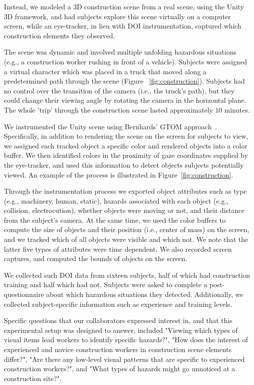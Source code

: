Instead, we modeled a 3D construction scene from a real scene, using the Unity 3D framework, and had subjects explore this scene virtually on a computer screen, while an eye-tracker, in lieu with DOI instrumentation, captured which construction elements they observed. 

The scene was dynamic and involved multiple unfolding hazardous situations (e.g., a construction worker rushing in front of a vehicle). Subjects were assigned a virtual character which was placed in a truck that moved along a predetermined path through the scene (Figure ~\ref{fig:construction}). Subjects had no control over the transition of the camera (i.e., the truck's path), but they could change their viewing angle by rotating the camera in the horizontal plane. The whole 'trip' through the construction scene lasted approximately $10$ minutes. 

We instrumented the Unity scene using Bernhards' GTOM approach~\cite{Bern14}. Specifically, in addition to rendering the scene on the screen for subjects to view, we assigned each tracked object a specific color and rendered objects into a color buffer. We then identified colors in the proximity of gaze coordinates supplied by the eye-tracker, and used this information to detect objects subjects potentially viewed. An example of the process is illustrated in Figure~\ref{fig:construction}.

Through the instrumentation process we exported object attributes such as type (e.g., machinery, human, static), hazards associated with each object (e.g., collision, electrocution), whether objects were moving or not,  and their distance from the subject's camera. At the same time, we used the color buffers to compute the size of objects and their position (i.e., center of mass) on the screen, and we tracked which of all objects were visible and which not. We note that the latter five types of attributes were time dependent. We also recorded screen captures, and computed the bounds of objects on the screen. 

We collected such DOI data from sixteen subjects, half of which had construction training and half which had not. Subjects were asked to complete a post-questionnaire about which hazardous situations they detected. Additionally, we collected subject-specific information such as experience and training levels. 

Specific questions that our collaborators expressed interest in, and that this experimental setup was designed to answer, included "Viewing which types of visual items lead workers to identify specific hazards?", "How does the interest of experienced and novice construction workers in construction scene elements differ?", "Are there any low-level visual patterns that are specific to experienced construction workers?", and "What types of hazards might go unnoticed at a construction site?".

